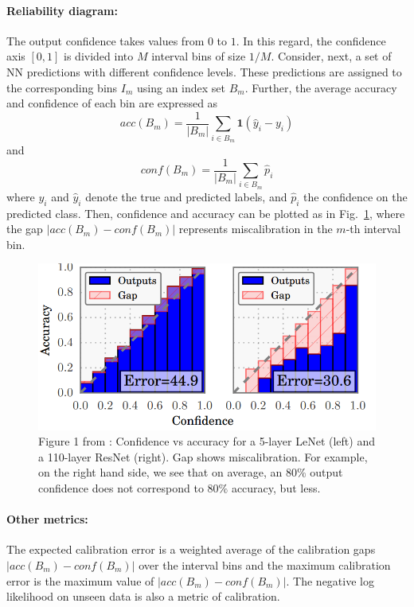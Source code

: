 \paragraph{Reliability diagram:}\label{sec:reliab_diag}
The output confidence takes values from $0$ to $1$. 
In this regard, the confidence axis $[0,1]$ is divided into $M$ interval bins of size $1/M$. 
Consider, next, a set of NN predictions with different confidence levels. 
These predictions are assigned to the corresponding bins $I_m$ using an index set $B_m$.
Further, the average accuracy and confidence of each bin are expressed as
\begin{equation}
acc(B_m) = \frac{1}{|B_m|}\sum_{i \in B_m}^{} \textbf{1}(\hat{y}_i-y_i)
\end{equation}
and 
\begin{equation}
conf(B_m) = \frac{1}{|B_m|}\sum_{i \in B_m}^{} \hat{p}_i
\end{equation}
where $y_i$ and $\hat{y}_i$ denote the true and predicted labels, and $\hat{p}_i$ the confidence on the predicted class. 
Then, confidence and accuracy can be plotted as in Fig.~\ref{fig:reliab}, where the gap $|acc(B_m)-conf(B_m)|$ represents miscalibration in the $m$-th interval bin.
\begin{figure}
	\centering
	\includegraphics[width=0.7\linewidth]{./Figures/reliab.png}
	\caption{Figure 1 from \textcite{guo2017calibration}: Confidence vs accuracy for a 5-layer LeNet (left) and a 110-layer ResNet (right).
		Gap shows miscalibration.
	For example, on the right hand side, we see that on average, an $80 \%$ output confidence does not correspond to $80 \%$ accuracy, but less.}
	\label{fig:reliab}
\end{figure} 

\paragraph{Other metrics:}
The expected calibration error is a weighted average of the calibration gaps $|acc(B_m)-conf(B_m)|$ over the interval bins and the maximum calibration error is the maximum value of $|acc(B_m)-conf(B_m)|$.
The negative log likelihood on unseen data is also a metric of calibration. 

